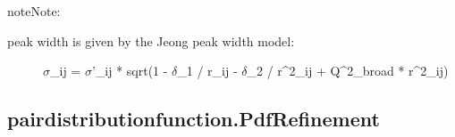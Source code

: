 \documentclass[letterpaper,10pt,english]{sphinxmanual}
\begin{document}
\begin{fulllineitems}
\begin{fulllineitems}
\begin{sphinxadmonition}{note}{Note:}\begin{description}
\item[{peak width is given by the Jeong peak width model:}] \leavevmode
\(\sigma\)\_ij = \(\sigma\)'\_ij * sqrt(1 - \(\delta\)\_1 / r\_ij - \(\delta\)\_2 / r\textasciicircum{}2\_ij + Q\textasciicircum{}2\_broad * r\textasciicircum{}2\_ij)

\end{description}
\end{sphinxadmonition}

\end{fulllineitems}


\end{fulllineitems}



\subsection{pairdistributionfunction.PdfRefinement}
\label{\detokenize{rst/pairdistributionfunction:pairdistributionfunction-pdfrefinement}}
\end{document}
